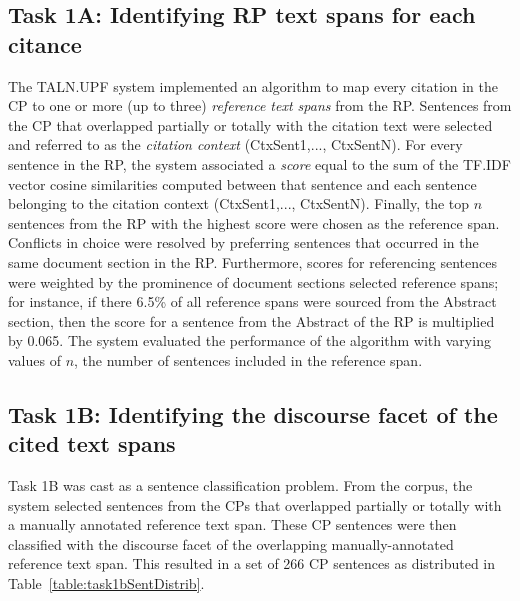 \documentclass[11pt]{article}
\begin{document}
\subsection{Task 1A: Identifying RP text spans for each citance}
The TALN.UPF system implemented an algorithm to 
map every citation in the CP to one or more (up to three) 
\textit{reference text spans} from the RP. Sentences from the CP 
that overlapped partially or totally with the citation text were 
selected and referred to as the \textit{citation context} 
(CtxSent1,..., CtxSentN). For every sentence in the RP, the system 
associated a \textit{score} equal to the sum of the TF.IDF vector 
cosine similarities computed between that sentence and each sentence 
belonging to the citation context (CtxSent1,..., CtxSentN). Finally, 
the top $n$ sentences from the RP with the highest score were
chosen as the reference span. Conflicts in choice were resolved by 
preferring sentences that occurred in the same document section in 
the RP.
Furthermore, scores for referencing sentences were weighted 
by the prominence of document sections selected reference spans; 
for instance, if there 6.5\% of all reference spans were sourced from the
Abstract section, then the score for a sentence from the Abstract 
of the RP is multiplied by 0.065. The system evaluated the performance 
of the algorithm with varying values of $n$, the number of sentences 
included in the reference span.

\subsection{Task 1B: Identifying the discourse facet  of the cited text spans}
Task 1B was cast as a sentence classification problem. From the
corpus, the system selected sentences from the CPs that overlapped
partially or totally with a manually annotated reference text span.
These CP sentences were then classified with the discourse facet of
the overlapping manually-annotated reference text span. This resulted
in a set of 266 CP sentences as distributed in
Table~\ref{table:task1bSentDistrib}.
\end{document}
